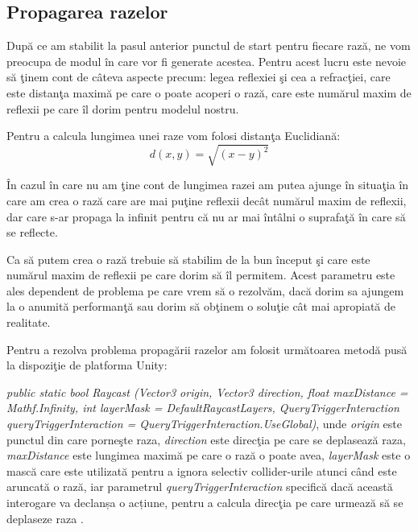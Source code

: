 \subsection{Propagarea razelor}

	Dup\u{a} ce am stabilit la pasul anterior punctul de start pentru fiecare raz\u{a}, ne vom preocupa de modul \^{i}n care vor fi generate acestea. Pentru acest lucru este nevoie s\u{a} \c{t}inem cont de c\^{a}teva aspecte precum: legea reflexiei \c{s}i cea a refrac\c{t}iei, care este distan\c{t}a maxim\u{a} pe care o poate acoperi o raz\u{a}, care este num\u{a}rul maxim de reflexii pe care \^{i}l dorim pentru modelul nostru.
	 
	
	Pentru a calcula lungimea unei raze vom folosi distan\c{t}a Euclidian\u{a}:
	\begin{equation}
		d(x,y) = \sqrt{(x-y)^2}
	\end{equation}

	\^{I}n cazul \^{i}n care nu am \c{t}ine cont de lungimea razei am putea ajunge \^{i}n situa\c{t}ia \^{i}n care am crea o raz\u{a} care are mai pu\c{t}ine reflexii dec\^{a}t num\u{a}rul maxim de reflexii, dar care s-ar propaga la infinit pentru c\u{a} nu ar mai \^{i}nt\^{a}lni o suprafa\c{t}\u{a} \^{i}n care s\u{a} se reflecte.
	
	 
	Ca s\u{a} putem crea o raz\u{a} trebuie s\u{a} stabilim de la bun \^{i}nceput \c{s}i care este num\u{a}rul maxim de reflexii pe care dorim s\u{a} \^{i}l permitem. Acest parametru este ales dependent de problema pe care vrem s\u{a} o rezolv\u{a}m, dac\u{a} dorim sa ajungem la o anumit\u{a} performan\c{t}\u{a} sau dorim s\u{a} ob\c{t}inem o solu\c{t}ie c\^{a}t mai apropiat\u{a} de realitate.
	
	 
	Pentru a rezolva problema propag\u{a}rii razelor am folosit urm\u{a}toarea metod\u{a} pus\u{a} la dispozi\c{t}ie de platforma Unity: 
	\begin{itemize}
		\utb 	\textit{public static bool Raycast (Vector3 origin, Vector3 direction, float maxDistance = Mathf.Infinity, int layerMask = DefaultRaycastLayers, QueryTriggerInteraction queryTriggerInteraction = QueryTriggerInteraction.UseGlobal)}, unde \textit{origin} este punctul din care porne\c{s}te raza, \textit{direction} este direc\c{t}ia pe care se deplaseaz\u{a} raza, \textit{maxDistance} este lungimea maxim\u{a} pe care o raz\u{a} o poate avea, \textit{layerMask} este o mască care este utilizată pentru a ignora selectiv collider-urile atunci când este aruncat\u{a} o rază, iar parametrul \textit{queryTriggerInteraction} specific\u{a} dacă această interogare va declanșa o acțiune, pentru a calcula direc\c{t}ia pe care urmeaz\u{a} s\u{a} se deplaseze raza \cite{raycast}.
	\end{itemize}
	 
